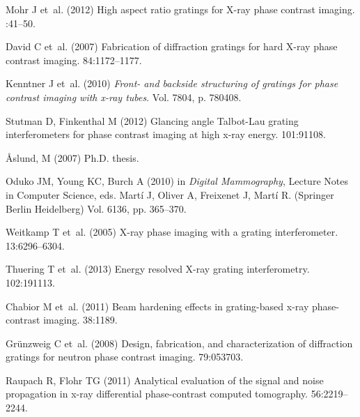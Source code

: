 \documentclass{pnastwo}
\begin{document}
\begin{article}
\begin{thebibliography}{10}
Mohr J et~al. (2012) {High aspect ratio gratings for X-ray phase contrast
  imaging}.
:41--50.

David C et~al. (2007) {Fabrication of diffraction gratings for hard X-ray phase
  contrast imaging}.
 84:1172--1177.

Kenntner J et~al. (2010) {\em {Front- and backside structuring of gratings for
  phase contrast imaging with x-ray tubes}}.
\newblock Vol.{} 7804, p. 780408.

Stutman D, Finkenthal M (2012) {Glancing angle Talbot-Lau grating
  interferometers for phase contrast imaging at high x-ray energy}.
 101:91108.

{\AA slund, M} (2007) Ph.D. thesis.

Oduko JM, Young KC, Burch A (2010) in {\em Digital Mammography}, Lecture Notes
  in Computer Science, eds.{} Martí J, Oliver A, Freixenet J, Martí R.
\newblock (Springer Berlin Heidelberg) Vol.{} 6136, pp. 365--370.

Weitkamp T et~al. (2005) {X-ray phase imaging with a grating interferometer}.
 13:6296--6304.

Thuering T et~al. (2013) {Energy resolved X-ray grating interferometry}.
 102:191113.

Chabior M et~al. (2011) {Beam hardening effects in grating-based x-ray
  phase-contrast imaging}.
 38:1189.

Gr\"{u}nzweig C et~al. (2008) {Design, fabrication, and characterization of
  diffraction gratings for neutron phase contrast imaging.}
 79:053703.

Raupach R, Flohr TG (2011) {Analytical evaluation of the signal and noise
  propagation in x-ray differential phase-contrast computed tomography.}
 56:2219--2244.

\end{thebibliography}

\end{article}
\end{document}
